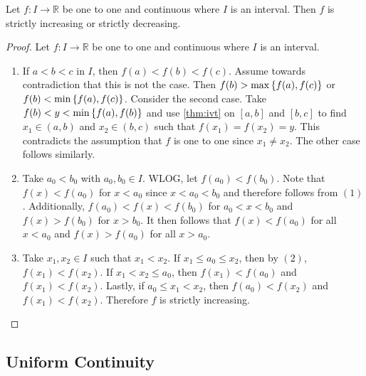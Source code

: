 \documentclass[../notes.tex]{subfiles}
\begin{document}
\begin{theorem}
    Let $f : I \to \mathbb{R}$ be one to one and continuous where $I$ is an interval. Then $f$ is strictly increasing or strictly decreasing.
\end{theorem}
\begin{proof}
    Let $f : I \to \mathbb{R}$ be one to one and continuous where $I$ is an interval.
    \begin{enumerate}
        \item
            If $a < b < c$ in $I$, then $f(a) < f(b) < f(c)$. Assume towards contradiction that this is not the case. Then $f(b) > \max\qty{f(a), f(c)}$ or $f(b) < \min\qty{f(a), f(c)}$. Consider the second case. Take $f(b) < y < \min\qty{f(a), f(b)}$ and use \ref{thm:ivt} on $[a,b]$ and $[b,c]$ to find $x_1 \in (a,b)$ and $x_2 \in (b,c)$ such that $f(x_1) = f(x_2) = y$. This contradicts the assumption that $f$ is one to one since $x_1 \neq x_2$. The other case follows similarly.
        \item
            Take $a_0 < b_0$ with $a_0,b_0 \in I$. WLOG, let $f(a_0) < f(b_0)$. Note that $f(x) < f(a_0)$ for $x < a_0$ since $x < a_0 < b_0$ and therefore follows from $(1)$. Additionally, $f(a_0) < f(x) < f(b_0)$ for $a_0 < x < b_0$ and $f(x) > f(b_0)$ for $x > b_0$. It then follows that $f(x) < f(a_0)$ for all $x < a_0$ and $f(x) > f(a_0)$ for all $x > a_0$.
        \item
            Take $x_1, x_2 \in I$ such that $x_1 < x_2$. If $x_1 \leq a_0 \leq x_2$, then by $(2)$, $f(x_1) < f(x_2)$. If $x_1 < x_2 \leq a_0$, then $f(x_1) < f(a_0)$ and $f(x_1) < f(x_2)$. Lastly, if $a_0 \leq x_1 < x_2$, then $f(a_0) < f(x_2)$ and $f(x_1) < f(x_2)$. Therefore $f$ is strictly increasing.
    \end{enumerate}
\end{proof}

\subsection{Uniform Continuity}
\end{document}
